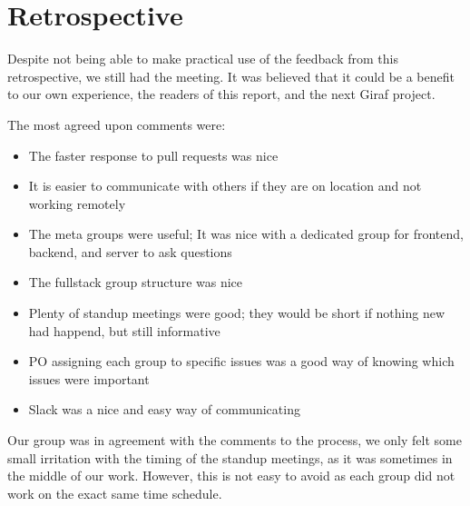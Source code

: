 \section{Retrospective}\label{SEC:Sprint4Retrospective}
Despite not being able to make practical use of the feedback from this retrospective, we still had the meeting. 
It was believed that it could be a benefit to our own experience, the readers of this report, and the next Giraf project.

The most agreed upon comments were:
\begin{itemize}
  \item The faster response to pull requests was nice
  \item It is easier to communicate with others if they are on location and not working remotely
  \item The meta groups were useful; It was nice with a dedicated group for frontend, backend, and server to ask questions
  \item The fullstack group structure was nice
  \item Plenty of standup meetings were good; they would be short if nothing new had happend, but still informative
  \item PO assigning each group to specific issues was a good way of knowing which issues were important
  \item Slack was a nice and easy way of communicating
\end{itemize}

Our group was in agreement with the comments to the process, we only felt some small irritation with the timing of the standup meetings, as it was sometimes in the middle of our work. 
However, this is not easy to avoid as each group did not work on the exact same time schedule.

